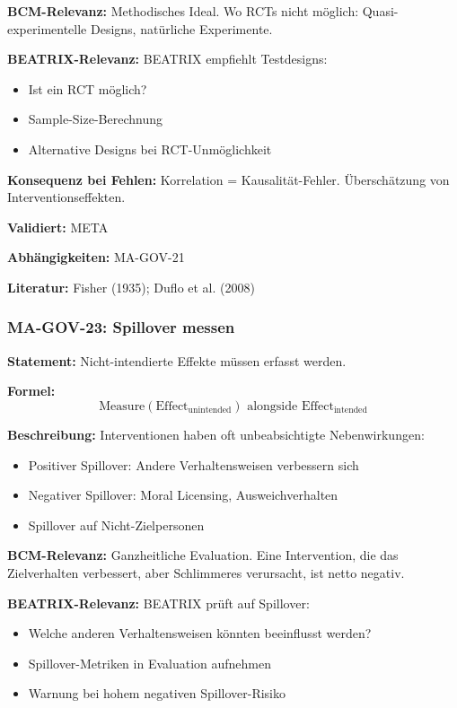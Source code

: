 \textbf{BCM-Relevanz:}
Methodisches Ideal. Wo RCTs nicht möglich: Quasi-experimentelle Designs, natürliche Experimente.

\textbf{BEATRIX-Relevanz:}
BEATRIX empfiehlt Testdesigns:
\begin{itemize}
    \item Ist ein RCT möglich?
    \item Sample-Size-Berechnung
    \item Alternative Designs bei RCT-Unmöglichkeit
\end{itemize}

\textbf{Konsequenz bei Fehlen:}
Korrelation = Kausalität-Fehler. Überschätzung von Interventionseffekten.

\textbf{Validiert:} META

\textbf{Abhängigkeiten:} MA-GOV-21

\textbf{Literatur:} Fisher (1935); Duflo et al. (2008)


\subsubsection*{MA-GOV-23: Spillover messen}

\textbf{Statement:} Nicht-intendierte Effekte müssen erfasst werden.

\textbf{Formel:}
\begin{equation}
\text{Measure}(\text{Effect}_{\text{unintended}}) \text{ alongside } \text{Effect}_{\text{intended}}
\end{equation}

\textbf{Beschreibung:}
Interventionen haben oft unbeabsichtigte Nebenwirkungen:
\begin{itemize}
    \item Positiver Spillover: Andere Verhaltensweisen verbessern sich
    \item Negativer Spillover: Moral Licensing, Ausweichverhalten
    \item Spillover auf Nicht-Zielpersonen
\end{itemize}

\textbf{BCM-Relevanz:}
Ganzheitliche Evaluation. Eine Intervention, die das Zielverhalten verbessert, aber Schlimmeres verursacht, ist netto negativ.

\textbf{BEATRIX-Relevanz:}
BEATRIX prüft auf Spillover:
\begin{itemize}
    \item Welche anderen Verhaltensweisen könnten beeinflusst werden?
    \item Spillover-Metriken in Evaluation aufnehmen
    \item Warnung bei hohem negativen Spillover-Risiko
\end{itemize}

